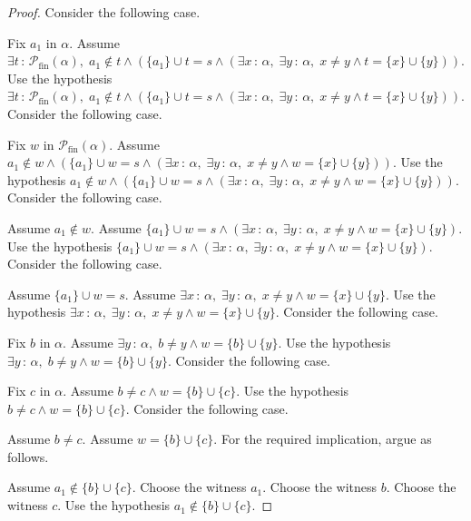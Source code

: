 \documentclass{article}
\theoremstyle{paperresult}
\newenvironment{proofstep}{\par\smallskip\ifdim\leftskip<3em\relax\advance\leftskip by 1em\relax\fi\noindent\ignorespaces}{\par\smallskip}
\begin{document}
\begin{proof}
Consider the following case.
\begin{proofstep}
Fix \(a_{1}\) in \(\alpha\).
Assume \(\exists t\, :\, \mathcal{P}_{\mathrm{fin}}(\alpha),\; a_{1} \notin t \land (\{a_{1}\} \cup t = s \land (\exists x\, :\, \alpha,\; \exists y\, :\, \alpha,\; x \ne y \land t = \{x\} \cup \{y\}))\).
Use the hypothesis \(\exists t\, :\, \mathcal{P}_{\mathrm{fin}}(\alpha),\; a_{1} \notin t \land (\{a_{1}\} \cup t = s \land (\exists x\, :\, \alpha,\; \exists y\, :\, \alpha,\; x \ne y \land t = \{x\} \cup \{y\}))\).
Consider the following case.
\begin{proofstep}
Fix \(w\) in \(\mathcal{P}_{\mathrm{fin}}(\alpha)\).
Assume \(a_{1} \notin w \land (\{a_{1}\} \cup w = s \land (\exists x\, :\, \alpha,\; \exists y\, :\, \alpha,\; x \ne y \land w = \{x\} \cup \{y\}))\).
Use the hypothesis \(a_{1} \notin w \land (\{a_{1}\} \cup w = s \land (\exists x\, :\, \alpha,\; \exists y\, :\, \alpha,\; x \ne y \land w = \{x\} \cup \{y\}))\).
Consider the following case.
\begin{proofstep}
Assume \(a_{1} \notin w\).
Assume \(\{a_{1}\} \cup w = s \land (\exists x\, :\, \alpha,\; \exists y\, :\, \alpha,\; x \ne y \land w = \{x\} \cup \{y\})\).
Use the hypothesis \(\{a_{1}\} \cup w = s \land (\exists x\, :\, \alpha,\; \exists y\, :\, \alpha,\; x \ne y \land w = \{x\} \cup \{y\})\).
Consider the following case.
\begin{proofstep}
Assume \(\{a_{1}\} \cup w = s\).
Assume \(\exists x\, :\, \alpha,\; \exists y\, :\, \alpha,\; x \ne y \land w = \{x\} \cup \{y\}\).
Use the hypothesis \(\exists x\, :\, \alpha,\; \exists y\, :\, \alpha,\; x \ne y \land w = \{x\} \cup \{y\}\).
Consider the following case.
\begin{proofstep}
Fix \(b\) in \(\alpha\).
Assume \(\exists y\, :\, \alpha,\; b \ne y \land w = \{b\} \cup \{y\}\).
Use the hypothesis \(\exists y\, :\, \alpha,\; b \ne y \land w = \{b\} \cup \{y\}\).
Consider the following case.
\begin{proofstep}
Fix \(c\) in \(\alpha\).
Assume \(b \ne c \land w = \{b\} \cup \{c\}\).
Use the hypothesis \(b \ne c \land w = \{b\} \cup \{c\}\).
Consider the following case.
\begin{proofstep}
Assume \(b \ne c\).
Assume \(w = \{b\} \cup \{c\}\).
For the required implication, argue as follows.
\begin{proofstep}
Assume \(a_{1} \notin \{b\} \cup \{c\}\).
Choose the witness \(a_{1}\).
Choose the witness \(b\).
Choose the witness \(c\).
Use the hypothesis \(a_{1} \notin \{b\} \cup \{c\}\).

\end{proofstep}
\end{proofstep}
\end{proofstep}
\end{proofstep}
\end{proofstep}
\end{proofstep}
\end{proofstep}
\end{proofstep}
\end{proof}
\end{document}
